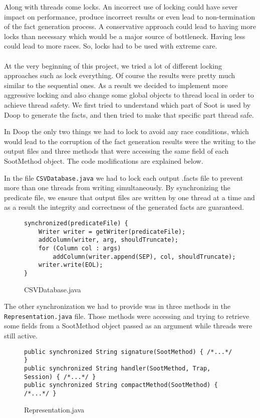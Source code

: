 \documentclass{dithesis}
\begin{document}
	Along with threads come locks. An incorrect use of locking could have sever impact on performance, produce incorrect results or even lead to non-termination of the fact generation process. A conservative approach could lead to having more locks than necessary which would be a major source of bottleneck. Having less could lead to more races. So, locks had to be used with extreme care.
    \\
    \\
	At the very beginning of this project, we tried a lot of different locking approaches such as lock everything. Of course the results were pretty much similar to the sequential ones. As a result we decided to implement more aggressive locking and also change some global objects to thread local in order to achieve thread safety. We first tried to understand which part of Soot is used by Doop to generate the facts, and then tried to make that specific part thread safe.


    	In Doop the only two things we had to lock to avoid any race conditions, which would lead to the corruption of the fact generation results were the writing to the output files and three methods that were accessing the same field of each SootMethod object. The code modifications are explained below.

	    	In the file \texttt{CSVDatabase.java} we had to lock each output .facts file to prevent more than one threads from writing simultaneously. By synchronizing the predicate file, we ensure that output files are written by one thread at a time and as a result the integrity and correctness of the generated facts are guaranteed.
	    	\begin{figure}[H]
\begin{lstlisting}
synchronized(predicateFile) {
    Writer writer = getWriter(predicateFile);
    addColumn(writer, arg, shouldTruncate);
    for (Column col : args)
        addColumn(writer.append(SEP), col, shouldTruncate);
    writer.write(EOL);
}
\end{lstlisting}
	        \caption{CSVDatabase.java}
	        \end{figure}

	    	The other synchronization we had to provide was in three methods in the \texttt{Representation.java} file. Those methods were accessing and trying to retrieve some fields from a SootMethod object passed as an argument while threads were still active.
	    	\begin{figure}[H]
\begin{lstlisting}
public synchronized String signature(SootMethod) { /*...*/ }
public synchronized String handler(SootMethod, Trap, Session) { /*...*/ }
public synchronized String compactMethod(SootMethod) { /*...*/ }
\end{lstlisting}
	        \caption{Representation.java}
	        \end{figure}
\end{document}
